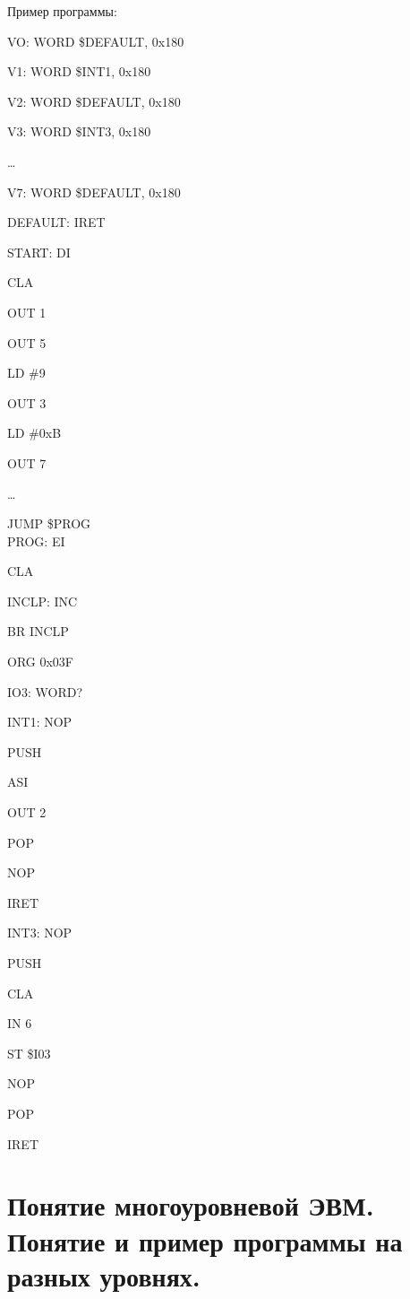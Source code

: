 \documentclass{article}
\begin{document}
\begin{minipage}{.5\textwidth}
    Пример программы:

    VO: WORD \$DEFAULT, 0x180 
    
    V1: WORD \$INT1, 0x180
    
    V2: WORD \$DEFAULT, 0x180 
    
    V3: WORD \$INT3, 0x180
    
    \dots
    
    V7: WORD \$DEFAULT, 0x180
    
    DEFAULT: IRET
    
    START: DI
    
    CLA
    
    OUT 1
    
    OUT 5
    
    LD \#9
    
    OUT 3
    
    LD \#0xB
    
    OUT 7
    
    \dots
    
    JUMP \$PROG
    \\ 
    
    
    PROG: EI
    
    CLA
    
    INCLP: INC
    
    BR INCLP
    
    ORG 0x03F
    
    IO3: WORD?
    
    
    INT1: NOP
    
    PUSH
    
    ASI
    
    OUT 2
    
    POP
    
    NOP
    
    IRET
    
    INT3: NOP
    
    PUSH
    
    CLA
    
    IN 6
    
    ST \$I03
    
    NOP
    
    POP
    
    IRET
\end{minipage}

\section{Понятие многоуровневой ЭВМ. Понятие и пример программы на разных уровнях.}
\end{document}
